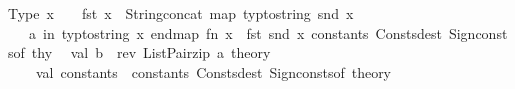\begin{isabellebody}
Type\ x\ {\isacharequal}{\kern0pt}{\isachargreater}{\kern0pt}\ {\isachardoublequote}{\kern0pt}{\isacharparenleft}{\kern0pt}{\isachardoublequote}{\kern0pt}\ {\isacharcircum}{\kern0pt}\ {\isacharparenleft}{\kern0pt}fst\ x{\isacharparenright}{\kern0pt}\ {\isacharcircum}{\kern0pt}\ String{\isachardot}{\kern0pt}concat\ {\isacharparenleft}{\kern0pt}map\ {\isacharparenleft}{\kern0pt}typ{\isacharunderscore}{\kern0pt}to{\isacharunderscore}{\kern0pt}string{\isacharparenright}{\kern0pt}\ {\isacharparenleft}{\kern0pt}snd\ x{\isacharparenright}{\kern0pt}{\isacharparenright}{\kern0pt}\ {\isacharcircum}{\kern0pt}\ {\isachardoublequote}{\kern0pt}{\isacharparenright}{\kern0pt}{\isachardoublequote}{\kern0pt}\isanewline
{\isacharbar}{\kern0pt}\ {\isacharunderscore}{\kern0pt}\ {\isacharequal}{\kern0pt}{\isachargreater}{\kern0pt}\ {\isachardoublequote}{\kern0pt}{\isacharparenleft}{\kern0pt}{\isacharquery}{\kern0pt}{\isacharprime}{\kern0pt}a{\isacharparenright}{\kern0pt}{\isachardoublequote}{\kern0pt}\ in\ typ{\isacharunderscore}{\kern0pt}to{\isacharunderscore}{\kern0pt}string\ x\ end{\isacharparenright}{\kern0pt}{\isacharparenleft}{\kern0pt}map\ {\isacharparenleft}{\kern0pt}fn\ x\ {\isacharequal}{\kern0pt}{\isachargreater}{\kern0pt}\ {\isacharparenleft}{\kern0pt}fst\ {\isacharparenleft}{\kern0pt}snd\ x{\isacharparenright}{\kern0pt}{\isacharparenright}{\kern0pt}{\isacharparenright}{\kern0pt}\ {\isacharparenleft}{\kern0pt}{\isacharhash}{\kern0pt}constants\ {\isacharparenleft}{\kern0pt}Consts{\isachardot}{\kern0pt}dest\ {\isacharparenleft}{\kern0pt}Sign{\isachardot}{\kern0pt}consts{\isacharunderscore}{\kern0pt}of\ thy{\isacharparenright}{\kern0pt}{\isacharparenright}{\kern0pt}{\isacharparenright}{\kern0pt}{\isacharparenright}{\kern0pt}{\isacharparenright}{\kern0pt}\isanewline
\isanewline
\ \ val\ b\ {\isacharequal}{\kern0pt}\ rev\ {\isacharparenleft}{\kern0pt}ListPair{\isachardot}{\kern0pt}zip\ {\isacharparenleft}{\kern0pt}a\ {\isacharat}{\kern0pt}{\isacharbraceleft}{\kern0pt}theory{\isacharbraceright}{\kern0pt}{\isacharparenright}{\kern0pt}{\isacharparenright}{\kern0pt}\isanewline
\isanewline
\ \ \ \ {\isacartoucheclose}\isanewline
\isanewline
{}\isamarkupfalse%
\ {\isacartoucheopen}\isanewline
\ \ \ \ val\ constants\ {\isacharequal}{\kern0pt}\ {\isacharhash}{\kern0pt}constants\ {\isacharparenleft}{\kern0pt}Consts{\isachardot}{\kern0pt}dest\ {\isacharparenleft}{\kern0pt}Sign{\isachardot}{\kern0pt}consts{\isacharunderscore}{\kern0pt}of\ {\isacharat}{\kern0pt}{\isacharbraceleft}{\kern0pt}theory{\isacharbraceright}{\kern0pt}{\isacharparenright}{\kern0pt}{\isacharparenright}{\kern0pt}\isanewline

\end{isabellebody}
